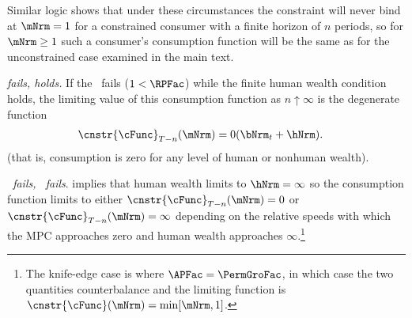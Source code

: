 \documentclass[\econtexRoot/BufferStockTheory]{subfiles}
\begin{document}
Similar logic shows that under these circumstances the constraint will never bind at $\mNrm=1$ for a constrained consumer with a finite horizon of $n$ periods, so for $\mNrm \geq 1$ such a consumer's consumption function will be the same as for the unconstrained case examined in the main text.

\hypertarget{cnclGICRawcnclRICFHWC}{}

\textit{{\RIC} fails, {\FHWC} holds.} If the \RIC~fails ($1 < \RPFac$) while the finite human wealth condition
holds, the limiting value of this consumption function as $n \uparrow
\infty$ is the degenerate function
\begin{equation}\begin{gathered}\begin{aligned}
  \cnstr{\cFunc}_{T-n}(\mNrm)  & = 0 (\bNrm_{t}+\hNrm).
\end{aligned}\end{gathered}\end{equation}
(that is, consumption is zero for any level of human or nonhuman wealth).

\hypertarget{cnclGICRawcnclRICcnclFHWC}{}

\textit{{\RIC}~fails, {\FHWC}~fails}. {\cncl{\FHWC}} implies that human wealth limits to $\hNrm =
\infty$ so the consumption function limits to either
$\cnstr{\cFunc}_{T-n}(\mNrm) = 0$ or
$\cnstr{\cFunc}_{T-n}(\mNrm) = \infty$ depending on the relative
speeds with which the MPC approaches zero and human wealth approaches
$\infty$.\footnote{The knife-edge case is where $\APFac = \PermGroFac$, in
  which case the two quantities counterbalance and the limiting
  function is $\cnstr{\cFunc}(\mNrm)=\min[\mNrm,1]$.}

\let\TableWidth\relax
{\newlength\TableWidth}
\end{document}
